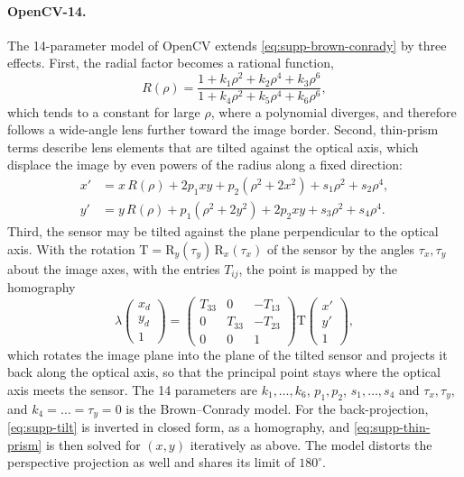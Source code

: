 \paragraph{OpenCV-14.} The 14-parameter model of OpenCV
\cite{opencv_library} extends \cref{eq:supp-brown-conrady} by three
effects. First, the radial factor becomes a rational function,
\begin{equation}
\label{eq:supp-rational}
    R(\rho) = \frac{1+k_1\rho^2+k_2\rho^4+k_3\rho^6}{1+k_4\rho^2+k_5\rho^4+k_6\rho^6},
\end{equation}
which tends to a constant for large $\rho$, where a polynomial
diverges, and therefore follows a wide-angle lens further toward the
image border. Second, thin-prism terms describe lens elements that
are tilted against the optical axis, which displace the image by even
powers of the radius along a fixed direction:
\begin{align}
\label{eq:supp-thin-prism}
    x' &= x\,R(\rho) + 2p_1xy + p_2(\rho^2+2x^2) + s_1\rho^2+s_2\rho^4,\nonumber\\
    y' &= y\,R(\rho) + p_1(\rho^2+2y^2) + 2p_2xy + s_3\rho^2+s_4\rho^4.
\end{align}
Third, the sensor may be tilted against the plane perpendicular to
the optical axis. With the rotation
$\mathrm{T}=\mathrm{R}_y(\tau_y)\,\mathrm{R}_x(\tau_x)$ of the sensor
by the angles $\tau_x,\tau_y$ about the image axes, with the entries
$T_{ij}$, the point is mapped by the homography
\begin{equation}
\label{eq:supp-tilt}
    \lambda\begin{pmatrix}x_d\\y_d\\1\end{pmatrix}
    = \begin{pmatrix} T_{33} & 0 & -T_{13}\\ 0 & T_{33} & -T_{23}\\ 0 & 0 & 1\end{pmatrix}
    \mathrm{T}\begin{pmatrix}x'\\y'\\1\end{pmatrix},
\end{equation}
which rotates the image plane into the plane of the tilted sensor
and projects it back along the optical axis, so that the principal
point stays where the optical axis meets the sensor. The 14
parameters are $k_1,\dots,k_6$, $p_1,p_2$, $s_1,\dots,s_4$ and
$\tau_x,\tau_y$, and $k_4=\dots=\tau_y=0$ is the Brown--Conrady
model. For the back-projection, \cref{eq:supp-tilt} is inverted in
closed form, as a homography, and \cref{eq:supp-thin-prism} is then
solved for $(x,y)$ iteratively as above. The model distorts
the perspective projection as well and shares its limit of
$180^\circ$.

